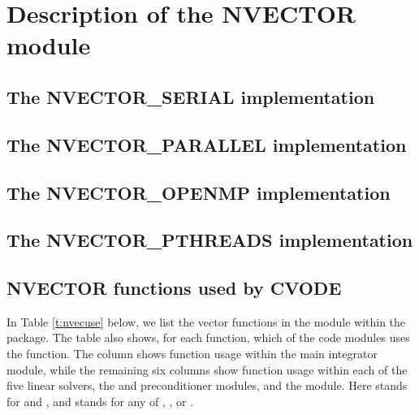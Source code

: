 \chapter{Description of the NVECTOR module}\label{s:nvector}


\section{The NVECTOR\_SERIAL implementation}\label{ss:nvec_ser}


\section{The NVECTOR\_PARALLEL implementation}\label{ss:nvec_par}


\section{The NVECTOR\_OPENMP implementation}\label{ss:nvec_openmp}


\section{The NVECTOR\_PTHREADS implementation}\label{ss:nvec_pthreads}


\section{NVECTOR functions used by CVODE}

In Table \ref{t:nvecuse} below, we list the vector functions in the 
{\nvector} module within the {\cvode} package.
The table also shows, for each function, which of the code modules uses
the function. The {\cvode} column shows function usage within the main
integrator module, while the remaining six columns show function usage
within each of the five {\cvode} linear solvers, the {\cvbandpre} and
{\cvbbdpre} preconditioner modules, and the {\fcvode} module.  Here
{\cvdls} stands for {\cvdense} and {\cvband}, and {\cvspils} stands for any
of {\cvspgmr}, {\cvspbcg}, or {\cvsptfqmr}.


